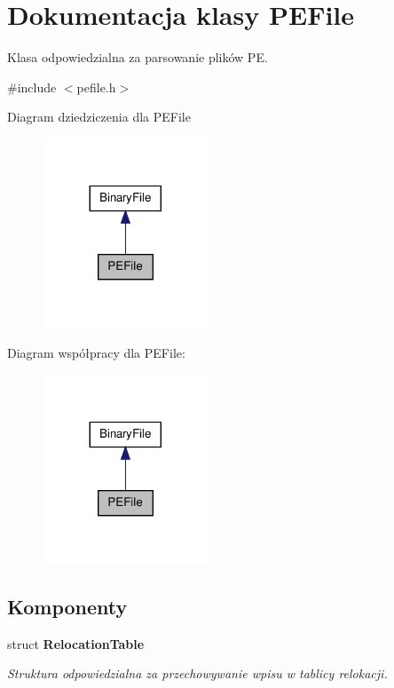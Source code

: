 \hypertarget{class_p_e_file}{\section{Dokumentacja klasy P\-E\-File}
\label{class_p_e_file}
}


Klasa odpowiedzialna za parsowanie plików P\-E.  




{\ttfamily \#include $<$pefile.\-h$>$}



Diagram dziedziczenia dla P\-E\-File\nopagebreak
\begin{figure}[H]
\begin{center}
\leavevmode
\includegraphics[width=140pt]{class_p_e_file__inherit__graph}
\end{center}
\end{figure}


Diagram współpracy dla P\-E\-File\-:\nopagebreak
\begin{figure}[H]
\begin{center}
\leavevmode
\includegraphics[width=140pt]{class_p_e_file__coll__graph}
\end{center}
\end{figure}
\subsection*{Komponenty}
\begin{DoxyCompactItemize}
\item 
struct {\bfseries Relocation\-Table}
\begin{DoxyCompactList}\small\item\em Struktura odpowiedzialna za przechowywanie wpisu w tablicy relokacji. \end{DoxyCompactList}\end{DoxyCompactItemize}
